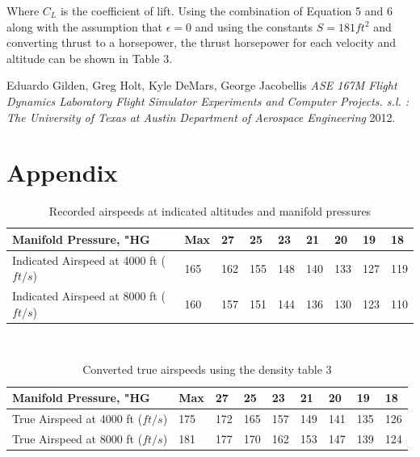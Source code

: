 \documentclass[letterpaper,11pt]{texMemo}
\begin{document}
Where \(C_{L}\) is the coefficient of lift. Using the combination of Equation 5 and 6 along with the assumption that \(\epsilon = 0\) and using the constants \(S = 181 ft^2\) and converting thrust to a horsepower, the thrust horsepower for each velocity and altitude can be shown in Table 3.


\begin{thebibliography}{0}
 Eduardo Gilden, Greg Holt, Kyle DeMars, George Jacobellis {\em ASE 167M Flight Dynamics Laboratory Flight Simulator Experiments and Computer Projects. s.l. : The University of Texas at Austin Department of Aerospace Engineering}  2012.
\end{thebibliography}

\section{Appendix}
\begin{table}[h]
\centering
\begin{tabular}{|l|l|l|l|l|l|l|l|l|} \hline
	{Manifold Pressure, "HG} & Max & 27 & 25 & 23 & 21 & 20 & 19 & 18\\ \hline
	{Indicated Airspeed at 4000 ft (\(ft/s\))} & 165 & 162 & 155 & 148 & 140 & 133 & 127 & 119\\ \hline
	{Indicated Airspeed at 8000 ft (\(ft/s\))} & 160 & 157 & 151 & 144 & 136 & 130 & 123 & 110\\ \hline
\end{tabular} \\
\caption{Recorded airspeeds at indicated altitudes and manifold pressures} \label{tab:Table1}
\end{table}

\begin{table}[h]
\centering
\begin{tabular}{|l|l|l|l|l|l|l|l|l|} \hline
	{Manifold Pressure, "HG} & Max & 27 & 25 & 23 & 21 & 20 & 19 & 18\\ \hline
	{True Airspeed at 4000 ft (\(ft/s\))} & 175 & 172 & 165 & 157 & 149 & 141 & 135 & 126\\ \hline
	{True Airspeed at 8000 ft (\(ft/s\))} & 181 & 177 & 170 & 162 & 153 & 147 & 139 & 124\\ \hline
\end{tabular} \\
\caption{Converted true airspeeds using the density table 3 } \label{tab:Table2}
\end{table}
\end{document}
